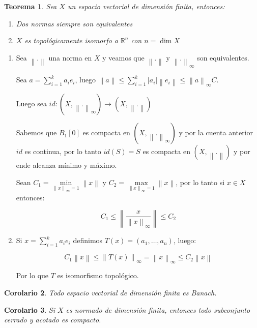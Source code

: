 \documentclass[11pt]{article}
\newcommand{\R}{{\mathbb{R}}}
\newcommand{\norm}[1]{\left\lVert#1\right\rVert}
\newcommand{\abs}[1]{\left\lvert#1\right\rvert}
\newtheorem{theorem}{Teorema}
\numberwithin{theorem}{subsection}
\newtheorem{corollary}[theorem]{Corolario}
\newenvironment{proof}[1][Demostraci\'on]{\begin{trivlist}
		\item[\hskip \labelsep {\bfseries #1}]}{\end{trivlist}}
\newcommand{\qed}{\nobreak \ifvmode \relax \else
	\ifdim\lastskip<1.5em \hskip-\lastskip
	\hskip1.5em plus0em minus0.5em \fi \nobreak
	\vrule height0.75em width0.5em depth0.25em\fi}
\begin{document}
\begin{theorem}
	\label{En dimension finita las normas son equivalentes}
	Sea $X$ un espacio vectorial de dimensi\'on finita, entonces:
	
	\begin{enumerate}
		\item Dos normas siempre son equivalentes
		\item $X$ es topol\'ogicamente isomorfo a $\R^n$ con $n = \dim X$
	\end{enumerate}
	
\end{theorem}

\begin{proof}
	\begin{enumerate}
		\item Sea $\norm{.}$ una norma en $X$ y veamos que $\norm{.}$ y $\norm{.}_{\infty}$ son equivalentes.
		
		Sea $a = \sum\limits_{i=1}^{k}{a_i e_i}$, luego $\norm{a} \leq \sum\limits_{i=1}^{k}{\abs{a_i}\norm{e_i}} \leq \norm{a}_{\infty}C$.
		
		Luego sea $id: (X,\norm{.}_{\infty}) \rightarrow (X,\norm{.})$
		
		Sabemos que $B_{1}[0]$ es compacta en $(X,\norm{.}_{\infty})$ y por la cuenta anterior $id$ es continua, por lo tanto $id(S) = S$ es compacta en $(X,\norm{.})$ y por ende alcanza m\'inimo y m\'aximo. 
		
		Sean $C_1 = \min\limits_{\norm{x}_{\infty} = 1} \norm{x}$ y $C_2 = \max\limits_{\norm{x}_{\infty} = 1} \norm{x}$, por lo tanto si $x \in X$ entonces:
		
		\[
		C_1 \leq \norm{\dfrac{x}{\norm{x}_{\infty}}} \leq C_2
		\]
		
		\item Si $x = \sum\limits_{i=1}^{k}{a_i e_i}$ definimos $T(x) = (a_1 , \dots, a_n)$, luego:
		
		$$C_1 \norm{x} \leq \norm{T(x)}_{\infty} = \norm{x}_{\infty} \leq C_2 \norm{x}$$
		
		Por lo que $T$ es isomorfismo topol\'ogico. \qed
	\end{enumerate}
\end{proof}

\begin{corollary}
	Todo espacio vectorial de dimensi\'on finita es Banach.
\end{corollary}

\begin{corollary}
	Si $X$ es normado de dimensi\'on finita, entonces todo subconjunto cerrado y acotado es compacto.
\end{corollary}
\end{document}
